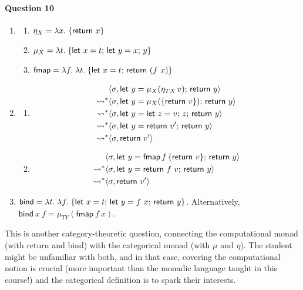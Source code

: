 \documentclass[11pt,a4paper,twoside]{article}
\begin{document}
\paragraph*{Question 10}
\begin{enumerate}[label=(\alph*)]
  \item
    \begin{enumerate}[label=(\roman*)]
      \item $\eta_X = \ulam{x}{\{\mathsf{return}\ x\}}$
      \item $\mu_X = \lambda t.\; \{\mathsf{let}\ x = t;\, \mathsf{let}\ y = x;\, y\}$
      \item $\mathsf{fmap} = \ulam{f}{\ulam{t}{\{\letseq{x}{t}{\mathsf{return}\ (f\ x)}\}}}$ 
    \end{enumerate}
  \item    
    \begin{enumerate}[label=(\roman*)]
      \item \begin{align*}
          & \langle \sigma, \mathsf{let}\ y = \mu_X(\eta_{TX} \, v);\, \mathsf{return}\ y \rangle \\
          \rightsquigarrow^* & \langle \sigma, \mathsf{let}\ y = \mu_X(\{\mathsf{return}\ v\});\, \mathsf{return}\ y \rangle \\
          \rightsquigarrow^* & \langle \sigma, \mathsf{let}\ y = \mathsf{let}\ z = v;\, z;\, \mathsf{return}\ y \rangle \\
          \rightsquigarrow^* & \langle \sigma, \mathsf{let}\ y = \mathsf{return}\ v';\, \mathsf{return}\ y \rangle \\
          \rightsquigarrow^* & \langle \sigma, \mathsf{return}\ v' \rangle
        \end{align*}
      \item \begin{align*}
          & \langle \sigma, \mathsf{let}\ y = \mathsf{fmap} \, f \, \{\mathsf{return}\ v\};\, \mathsf{return}\ y \rangle\\
          \rightsquigarrow^* & \langle \sigma, \mathsf{let}\ y = \mathsf{return}\ f\ v;\, \mathsf{return}\ y \rangle \\
          \rightsquigarrow^* & \langle \sigma, \mathsf{return}\ v' \rangle
        \end{align*}
    \end{enumerate}
  \item $\mathsf{bind} = \lambda t.\; \lambda f.\; \{\mathsf{let}\ x = t;\, \mathsf{let}\ y = f\ x;\, \mathsf{return}\ y \}$.
  Alternatively, $\mathsf{bind}\ x\ f = \mu_{TY}(\mathsf{fmap}\ f\ x)$.
\end{enumerate}
%
This is another category-theoretic question, connecting the computational monad
(with return and bind) with the categorical monad (with $\mu$ and $\eta$).
The student might be unfamiliar with both, and in that case,
covering the computational notion is crucial (more important than
the monadic language taught in this course!) and the categorical definition
is to spark their interests.
\end{document}
